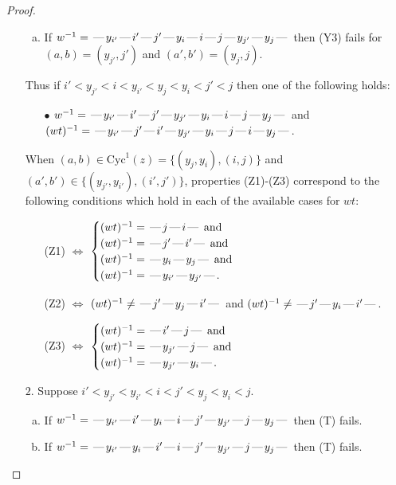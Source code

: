 \documentclass[10pt]{article}
\theoremstyle{definition}
\theoremstyle{definition}
\def\dash{\text{\hspace{0.5mm}---\hspace{0.5mm}}}
\def\Cyc{\mathrm{Cyc}}
\begin{document}
\begin{proof}
\begin{enumerate}
\begin{enumerate}[(a)]
\item If $w^{-1} = \dash y_{i'}\dash i'\dash j'\dash y_i\dash i\dash j\dash y_{j'}\dash y_j\dash $ then (Y3) fails for $(a,b)=(y_{j'},j')$ and $(a',b')=(y_j,j)$.
\end{enumerate}
Thus if $i' < y_{j'} < i < y_{i'} < y_j < y_i < j' < j$ then one of the following holds:
\begin{enumerate}
\item[$\bullet$] $w^{-1} = \dash y_{i'}\dash i'\dash j'\dash y_{j'}\dash y_i\dash i\dash j\dash y_j\dash $ and $(wt)^{-1} = \dash y_{i'}\dash j'\dash i'\dash y_{j'}\dash y_i\dash j\dash i\dash y_j\dash $.
\end{enumerate}
When $(a,b)\in\Cyc^1(z)=\{(y_j,y_i),(i,j)\}$ and $(a',b')\in\{(y_{j'},y_{i'}),(i',j')\}$,
properties (Z1)-(Z3) correspond to the following conditions which
hold in each of the available cases for $wt$:
\begin{enumerate}
\item[](Z1) $\Leftrightarrow$ $\begin{cases}\text{$(wt)^{-1} = \dash j \dash i \dash$}\text{ and }\\
\text{$(wt)^{-1} = \dash j' \dash i' \dash$}\text{ and }\\
\text{$(wt)^{-1} = \dash y_i \dash y_j \dash$}\text{ and }\\
\text{$(wt)^{-1} = \dash y_{i'} \dash y_{j'} \dash$}.\end{cases}$
\item[](Z2) $\Leftrightarrow$ $(wt)^{-1} \neq \dash j' \dash y_j \dash i' \dash$ and $(wt)^{-1}\neq \dash j' \dash y_i \dash i' \dash$.
\item[](Z3) $\Leftrightarrow$ $\begin{cases}\text{$(wt)^{-1} = \dash i' \dash j \dash$}\text{ and }\\
\text{$(wt)^{-1} = \dash y_{j'} \dash j \dash$}\text{ and }\\
\text{$(wt)^{-1} = \dash y_{j'} \dash y_i \dash$}.\end{cases}$
\end{enumerate}
\item[$2$.] Suppose $i' < y_{j'} < y_{i'} < i < j' < y_j < y_i < j$.
\begin{enumerate}[(a)]
\item If $w^{-1} = \dash y_{i'}\dash i'\dash y_i\dash i\dash j'\dash y_{j'}\dash j\dash y_j\dash $ then (T) fails.
\item If $w^{-1} = \dash y_{i'}\dash y_i\dash i'\dash i\dash j'\dash y_{j'}\dash j\dash y_j\dash $ then (T) fails.

\end{enumerate}
\end{enumerate}
\end{proof}
\end{document}
